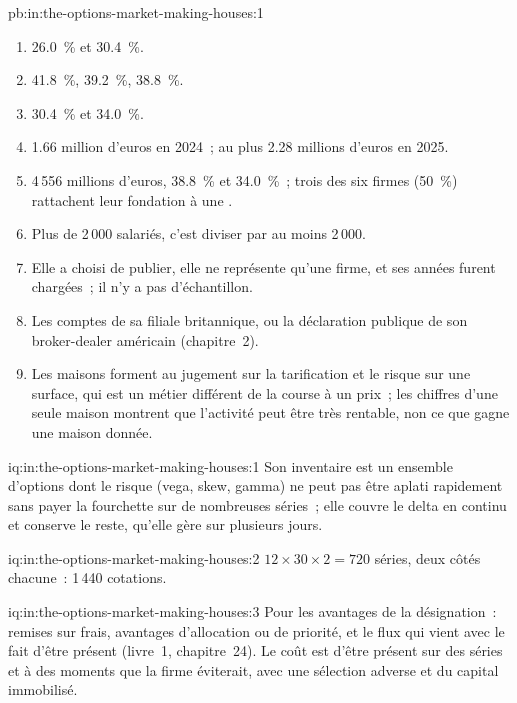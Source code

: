\begin{solution}{pb:in:the-options-market-making-houses:1}
\begin{enumerate}
\item 26.0~\% et 30.4~\%.
\item 41.8~\%, 39.2~\%, 38.8~\%.
\item 30.4~\% et 34.0~\%.
\item 1.66 million d'euros en 2024~; au plus 2.28 millions d'euros en 2025.
\item 4\,556 millions d'euros, 38.8~\% et 34.0~\%~; trois des six firmes (50~\%) rattachent leur fondation à une .
\item Plus de 2\,000 salariés, c'est diviser par au moins 2\,000.
\item Elle a choisi de publier, elle ne représente qu'une firme, et ses années furent chargées~; il n'y a pas d'échantillon.
\item Les comptes de sa filiale britannique, ou la déclaration publique de son broker-dealer américain (chapitre~2).
\item Les maisons forment au jugement sur la tarification et le risque sur une surface, qui est un métier différent de la course à un
prix~; les chiffres d'une seule maison montrent que l'activité peut être très rentable, non ce que gagne une maison donnée.
\end{enumerate}
\end{solution}

\begin{solution}{iq:in:the-options-market-making-houses:1}
Son inventaire est un ensemble d'options dont le risque (vega, skew, gamma) ne peut pas être aplati rapidement sans payer la fourchette
sur de nombreuses séries~; elle couvre le delta en continu et conserve le reste, qu'elle gère sur plusieurs jours.
\end{solution}

\begin{solution}{iq:in:the-options-market-making-houses:2}
$12\times30\times2=720$ séries, deux côtés chacune~: 1\,440 cotations.
\end{solution}

\begin{solution}{iq:in:the-options-market-making-houses:3}
Pour les avantages de la désignation~: remises sur frais, avantages d'allocation ou de priorité, et le flux qui vient avec le fait d'être
présent (livre~1, chapitre~24). Le coût est d'être présent sur des séries et à des moments que la firme éviterait, avec une sélection adverse
et du capital immobilisé.
\end{solution}

